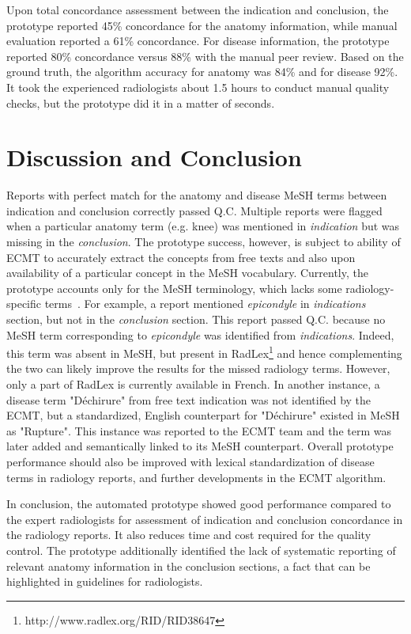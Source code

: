\documentclass{IOS-Book-Article}
\begin{document}
Upon total concordance assessment between the indication and conclusion, the prototype reported 45\% concordance for the anatomy information, while manual evaluation reported a 61\% concordance.
For disease information, the prototype reported 80\% concordance versus 88\% with the manual peer review.
Based on the ground truth, the algorithm accuracy for anatomy was 84\% and for disease 92\%.
It took the experienced radiologists about 1.5 hours to conduct manual quality checks, but the prototype did it in a matter of seconds.
%
\section{Discussion and Conclusion}
%
Reports with perfect match for the anatomy and disease MeSH terms between indication and conclusion correctly passed Q.C. Multiple reports were flagged when a particular anatomy term (e.g. knee) was mentioned in \emph{indication} but was missing in the \emph{conclusion}.
The prototype success, however, is subject to ability of ECMT to accurately extract the concepts from free texts and also upon availability of a particular concept in the MeSH vocabulary.
Currently, the prototype accounts only for the MeSH terminology, which lacks some radiology-specific terms~\cite{Demner-Fushman2015-ym}.
For example, a report mentioned \emph{epicondyle} in \emph{indications} section, but not in the \emph{conclusion} section.
This report passed Q.C. because no MeSH term corresponding to \emph{epicondyle} was identified from \emph{indications}.
Indeed, this term was absent in MeSH, but present in RadLex\footnote{http://www.radlex.org/RID/RID38647} and hence complementing the two can likely improve the results for the missed radiology terms.
However, only a part of RadLex is currently available in French.
In another instance, a disease term "D\'echirure" from free text indication was not identified by the ECMT, but a standardized, English counterpart for "D\'echirure" existed in MeSH as "Rupture".
This instance was reported to the ECMT team and the term was later added and semantically linked to its MeSH counterpart.
Overall prototype performance should also be improved with lexical standardization of disease terms in radiology reports, and further developments in the ECMT algorithm.

In conclusion, the automated prototype showed good performance compared to the expert radiologists for assessment of indication and conclusion concordance in the radiology reports.
It also reduces time and cost required for the quality control.
The prototype additionally identified the lack of systematic reporting of relevant anatomy information in the conclusion sections, a fact that can be highlighted in guidelines for radiologists.
%
 
%

%
\end{document}
